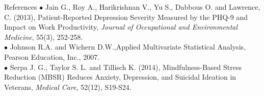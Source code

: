 \documentclass{beamer}
\begin{document}
\begin{frame} {References}
	$\bullet$ Jain G., Roy A., Harikrishnan V., Yu S., Dabbous O. and Lawrence, C. (2013), Patient-Reported Depression Severity Measured by the PHQ-9 and Impact on Work Productivity, \emph{Journal of Occupational and Environmental Medicine}, 55(3), 252-258.\\
	
	$\bullet$ Johnson R.A. and Wichern D.W.,Applied Multivariate Statistical Analysis, Pearson Education, Inc., 2007.\\
	
	$\bullet$ Serpa J. G., Taylor S. L. and Tillisch K. (2014), Mindfulness-Based Stress Reduction (MBSR) Reduces Anxiety, Depression, and Suicidal Ideation in Veterans, \emph{Medical Care}, 52(12), S19-S24.
	
\end{frame}
\end{document}
